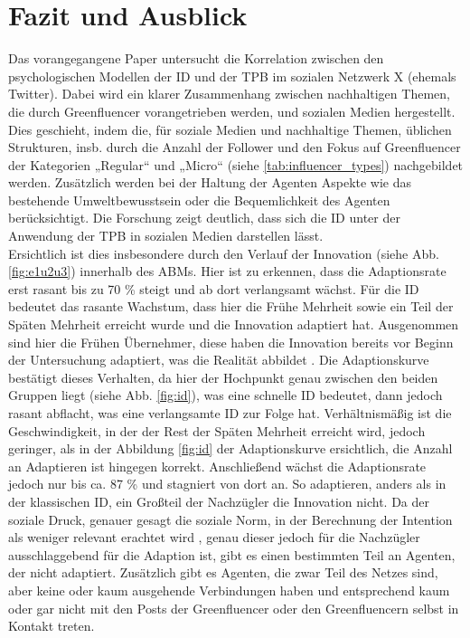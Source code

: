 \documentclass[runningheads]{llncs}
\begin{document}
\section{Fazit und Ausblick}
Das vorangegangene Paper untersucht die Korrelation zwischen den psychologischen Modellen der ID und der TPB im sozialen Netzwerk X (ehemals Twitter). 
Dabei wird ein klarer Zusammenhang zwischen nachhaltigen Themen, die durch Greenfluencer vorangetrieben werden, und sozialen Medien hergestellt.
Dies geschieht, indem die, für soziale Medien und nachhaltige Themen, üblichen Strukturen, insb. durch die Anzahl der Follower und den Fokus auf Greenfluencer der Kategorien „Regular“ und „Micro“ (siehe \ref{tab:influencer_types}) nachgebildet werden. 
Zusätzlich werden bei der Haltung der Agenten Aspekte wie das bestehende Umweltbewusstsein oder die Bequemlichkeit des Agenten berücksichtigt. 
Die Forschung zeigt deutlich, dass sich die ID unter der Anwendung der TPB in sozialen Medien darstellen lässt. \\
\indent Ersichtlich ist dies insbesondere durch den Verlauf der Innovation (siehe Abb. \ref{fig:e1u2u3}) innerhalb des ABMs. Hier ist zu erkennen, dass die Adaptionsrate erst rasant bis zu 70 \% steigt und ab dort verlangsamt wächst. Für die ID bedeutet das rasante Wachstum, dass hier die Frühe Mehrheit sowie ein Teil der Späten Mehrheit erreicht wurde und die Innovation adaptiert hat. Ausgenommen sind hier die Frühen Übernehmer, diese haben die Innovation bereits vor Beginn der Untersuchung adaptiert, was die Realität abbildet \cite{ifd_allensbach_naturschutz_2023}. Die Adaptionskurve bestätigt dieses Verhalten, da hier der Hochpunkt genau zwischen den beiden Gruppen liegt (siehe Abb. \ref{fig:id}), was eine schnelle ID bedeutet, dann jedoch rasant abflacht, was eine verlangsamte ID zur Folge hat. Verhältnismäßig ist die Geschwindigkeit, in der der Rest der Späten Mehrheit erreicht wird, jedoch geringer, als in der Abbildung \ref{fig:id} der Adaptionskurve ersichtlich, die Anzahl an Adaptieren ist hingegen korrekt. Anschließend wächst die Adaptionsrate jedoch nur bis ca. 87 \% und stagniert von dort an. So adaptieren, anders als in der klassischen ID, ein Großteil der Nachzügler die Innovation nicht. Da der soziale Druck, genauer gesagt die soziale Norm, in der Berechnung der Intention als weniger relevant erachtet wird \cite{schwarz_agent-based_2009,liao_exploring_2024}, genau dieser jedoch für die Nachzügler ausschlaggebend für die Adaption ist, gibt es einen bestimmten Teil an Agenten, der nicht adaptiert. Zusätzlich gibt es Agenten, die zwar Teil des Netzes sind, aber keine oder kaum ausgehende Verbindungen haben und entsprechend kaum oder gar nicht mit den Posts der Greenfluencer oder den Greenfluencern selbst in Kontakt treten. 
\end{document}
